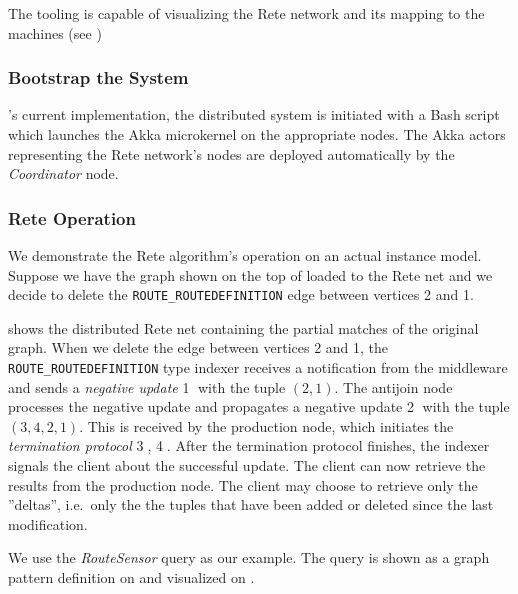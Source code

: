 The tooling is capable of visualizing the Rete network and its mapping to the machines (see )


\subsubsection{Bootstrap the System}

\iqd{}'s current implementation, the distributed system is initiated with a Bash script which launches the Akka microkernel on the appropriate nodes. The Akka actors representing the Rete network's nodes are deployed automatically by the \iqd{} \textit{Coordinator} node.

\subsubsection{Rete Operation}

We demonstrate the Rete algorithm's operation on an actual instance model. Suppose we have the graph shown on the top of  loaded to the Rete net and we decide to delete the \texttt{ROUTE\_ROUTEDEFINITION} edge between vertices 2 and 1.


 shows the distributed Rete net containing the partial matches of the original graph. When we delete the edge between vertices 2 and 1, the \texttt{ROUTE\_ROUTEDEFINITION} type indexer receives a notification from the middleware and sends a \textit{negative update} \textcircled{1} with the tuple $(2, 1)$. The antijoin node processes the negative update and propagates a negative update \textcircled{2} with the tuple $(3, 4, 2, 1)$. This is received by the production node, which initiates the \textit{termination protocol} \textcircled{3}, \textcircled{4}. After the termination protocol finishes, the indexer signals the client about the successful update. The client can now retrieve the results from the production node. The client may choose to retrieve only the ''deltas'', i.e.\ only the the tuples that have been added or deleted since the last modification.


We use the \textit{RouteSensor} query as our example. The query is shown as a graph pattern definition on  and visualized on .
